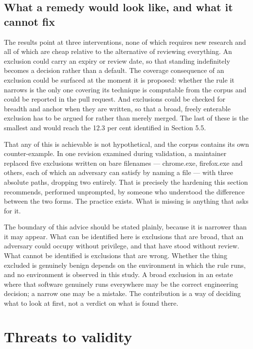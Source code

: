 \subsection{What a remedy would look like, and what it cannot fix}
\label{sec:remedy}

The results point at three interventions, none of which requires new research and all of which are cheap relative to the alternative of reviewing everything. An exclusion could carry an expiry or review date, so that standing indefinitely becomes a decision rather than a default. The coverage consequence of an exclusion could be surfaced at the moment it is proposed: whether the rule it narrows is the only one covering its technique is computable from the corpus and could be reported in the pull request. And exclusions could be checked for breadth and anchor when they are written, so that a broad, freely enterable exclusion has to be argued for rather than merely merged. The last of these is the smallest and would reach the 12.3 per cent identified in Section 5.5.

That any of this is achievable is not hypothetical, and the corpus contains its own counter-example. In one revision examined during validation, a maintainer replaced five exclusions written on bare filenames --- chrome.exe, firefox.exe and others, each of which an adversary can satisfy by naming a file --- with three absolute paths, dropping two entirely. That is precisely the hardening this section recommends, performed unprompted, by someone who understood the difference between the two forms. The practice exists. What is missing is anything that asks for it.

The boundary of this advice should be stated plainly, because it is narrower than it may appear. What can be identified here is exclusions that are broad, that an adversary could occupy without privilege, and that have stood without review. What cannot be identified is exclusions that are wrong. Whether the thing excluded is genuinely benign depends on the environment in which the rule runs, and no environment is observed in this study. A broad exclusion in an estate where that software genuinely runs everywhere may be the correct engineering decision; a narrow one may be a mistake. The contribution is a way of deciding what to look at first, not a verdict on what is found there.

\section{Threats to validity}
\label{sec:threats}

